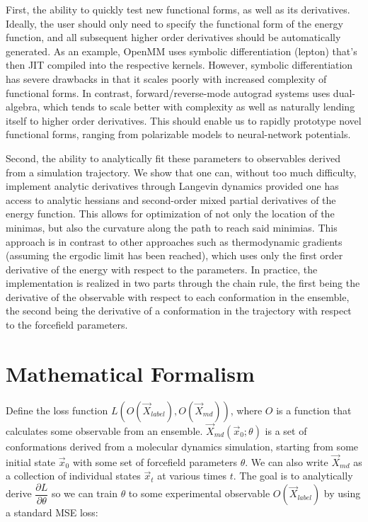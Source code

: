 \documentclass{article}
\begin{document}
First, the ability to quickly test new functional forms, as well as its derivatives. Ideally, the user should only need to specify the functional form of the energy function, and all subsequent higher order derivatives should be automatically generated. As an example, OpenMM uses symbolic differentiation (lepton) that's then JIT compiled into the respective kernels. However, symbolic differentiation has severe drawbacks in that it scales poorly with increased complexity of functional forms. In contrast, forward/reverse-mode autograd systems uses dual-algebra, which tends to scale better with complexity as well as naturally lending itself to higher order derivatives. This should enable us to rapidly prototype novel functional forms, ranging from polarizable models to neural-network potentials.

Second, the ability to analytically fit these parameters to observables derived from a simulation trajectory. We show that one can, without too much difficulty, implement analytic derivatives through Langevin dynamics provided one has access to analytic hessians and second-order mixed partial derivatives of the energy function. This allows for optimization of not only the location of the minimas, but also the curvature along the path to reach said minimias. This approach is in contrast to other approaches such as thermodynamic gradients (assuming the ergodic limit has been reached), which uses only the first order derivative of the energy with respect to the parameters. In practice, the implementation is realized in two parts through the chain rule, the first being the derivative of the observable with respect to each conformation in the ensemble, the second being the derivative of a conformation in the trajectory with respect to the forcefield parameters.

\section{Mathematical Formalism}

Define the loss function $L(O(\vec{X}_{label}), O(\vec{X}_{md}))$, where $O$ is a function that calculates some observable from an ensemble. $\vec{X}_{md}(\vec{x}_0; \theta)$ is a set of conformations derived from a molecular dynamics simulation, starting from some initial state $\vec{x}_0$ with some set of forcefield parameters $\theta$. We can also write $\vec{X}_{md}$ as a collection of individual states $\vec{x}_t$ at various times $t$. The goal is to analytically derive $\dfrac{\partial L}{\partial \theta}$ so we can train $\theta$ to some experimental observable $O(\vec{X}_{label})$ by using a standard MSE loss:
\end{document}
